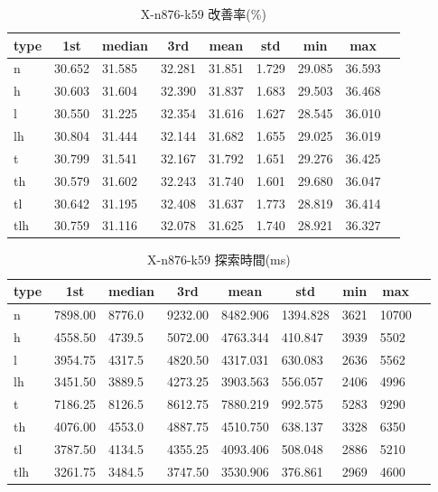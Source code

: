 \begin{table}[htbp]
    \centering
    \caption{X-n876-k59 改善率(\%)}
    \begin{tabular}{|l|l|l|l|l|l|l|l|l|}\hline
    \multicolumn{1}{|c|}{\textbf{type}}
    &\multicolumn{1}{|c|}{\textbf{1st}}
    &\multicolumn{1}{c|}{\textbf{median}}
    &\multicolumn{1}{c|}{\textbf{3rd}}
    &\multicolumn{1}{c|}{\textbf{mean}}
    &\multicolumn{1}{c|}{\textbf{std}}
    &\multicolumn{1}{c|}{\textbf{min}}
    &\multicolumn{1}{c|}{\textbf{max}}\\\hline
	n & 30.652 & 31.585 & 32.281 & 31.851 & 1.729 & 29.085 & 36.593\\\hline
	h & 30.603 & 31.604 & 32.390 & 31.837 & 1.683 & 29.503 & 36.468\\\hline
	l & 30.550 & 31.225 & 32.354 & 31.616 & 1.627 & 28.545 & 36.010\\\hline
	lh & 30.804 & 31.444 & 32.144 & 31.682 & 1.655 & 29.025 & 36.019\\\hline
	t & 30.799 & 31.541 & 32.167 & 31.792 & 1.651 & 29.276 & 36.425\\\hline
	th & 30.579 & 31.602 & 32.243 & 31.740 & 1.601 & 29.680 & 36.047\\\hline
	tl & 30.642 & 31.195 & 32.408 & 31.637 & 1.773 & 28.819 & 36.414\\\hline
	tlh & 30.759 & 31.116 & 32.078 & 31.625 & 1.740 & 28.921 & 36.327\\\hline
	\end{tabular}
\end{table}
\begin{table}[htbp]
    \centering
    \caption{X-n876-k59 探索時間(ms)}
    \begin{tabular}{|l|l|l|l|l|l|l|l|l|}\hline
    \multicolumn{1}{|c|}{\textbf{type}}
    &\multicolumn{1}{|c|}{\textbf{1st}}
    &\multicolumn{1}{c|}{\textbf{median}}
    &\multicolumn{1}{c|}{\textbf{3rd}}
    &\multicolumn{1}{c|}{\textbf{mean}}
    &\multicolumn{1}{c|}{\textbf{std}}
    &\multicolumn{1}{c|}{\textbf{min}}
    &\multicolumn{1}{c|}{\textbf{max}}\\\hline
	n & 7898.00 & 8776.0 & 9232.00 & 8482.906 & 1394.828 & 3621 & 10700\\\hline
	h & 4558.50 & 4739.5 & 5072.00 & 4763.344 & 410.847 & 3939 & 5502\\\hline
	l & 3954.75 & 4317.5 & 4820.50 & 4317.031 & 630.083 & 2636 & 5562\\\hline
	lh & 3451.50 & 3889.5 & 4273.25 & 3903.563 & 556.057 & 2406 & 4996\\\hline
	t & 7186.25 & 8126.5 & 8612.75 & 7880.219 & 992.575 & 5283 & 9290\\\hline
	th & 4076.00 & 4553.0 & 4887.75 & 4510.750 & 638.137 & 3328 & 6350\\\hline
	tl & 3787.50 & 4134.5 & 4355.25 & 4093.406 & 508.048 & 2886 & 5210\\\hline
	tlh & 3261.75 & 3484.5 & 3747.50 & 3530.906 & 376.861 & 2969 & 4600\\\hline
	\end{tabular}
\end{table}
